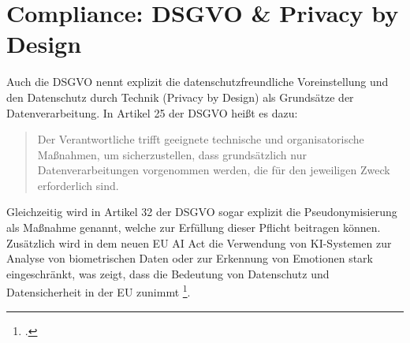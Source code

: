 \section{Compliance: \ac{DSGVO} \& Privacy by Design}
Auch die \ac{DSGVO} nennt explizit die datenschutzfreundliche Voreinstellung und den Datenschutz durch Technik (Privacy by Design) als Grundsätze der Datenverarbeitung. In Artikel 25 der \ac{DSGVO} heißt es dazu:
\begin{quote}
  Der Verantwortliche trifft geeignete technische und organisatorische Maßnahmen, um sicherzustellen, dass grundsätzlich nur Datenverarbeitungen vorgenommen werden, die für den jeweiligen Zweck erforderlich sind.
\end{quote}
Gleichzeitig wird in Artikel 32 der \ac{DSGVO} sogar explizit die Pseudonymisierung als Maßnahme genannt, welche zur Erfüllung dieser Pflicht beitragen können.
Zusätzlich wird in dem neuen EU AI Act die Verwendung von \ac{KI}-Systemen zur Analyse von biometrischen Daten oder zur Erkennung von Emotionen stark eingeschränkt, was zeigt, dass die Bedeutung von Datenschutz und Datensicherheit in der EU zunimmt \footcite{europeanparliament2025interplayaact}.